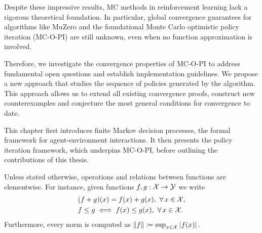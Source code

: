 \vspace{-0.1cm}


Despite these impressive results, MC methods in reinforcement learning lack a rigorous theoretical foundation. In particular, 
global convergence guarantees
for algorithms like MuZero and the foundational Monte Carlo optimistic policy iteration (MC-O-PI) are still unknown,
even when no function approximation is involved.

\vspace{-0.1cm}


Therefore, we investigate the convergence properties of MC-O-PI to address fundamental open questions and establish implementation guidelines.
We propose a new approach that studies the sequence of policies generated by the algorithm.
This approach allows us to extend all existing convergence proofs, construct new counterexamples and conjecture the most general conditions for convergence to date.


This chapter first introduces finite Markov decision processes, the formal framework for agent-environment interactions.
It then presents the policy iteration framework, which underpins MC-O-PI,
before outlining the contributions of this thesis.


\vspace{-0.1cm}


Unless stated otherwise,
operations and relations between functions are elementwise.
For instance, given functions $f, g : \mathcal{X} \to \mathcal{Y}$
we write
\begin{align*}
    &(f + g)(x) = f(x) + g(x), \ \forall \, x \in \mathcal{X} ,
    \\
    &f \leq g \iff f(x) \leq g(x), \ \forall \, x \in \mathcal{X} .
\end{align*}
Furthermore, every norm is computed as $\| f \| \coloneqq \sup_{x \in \mathcal{X}} | f(x) | $.

